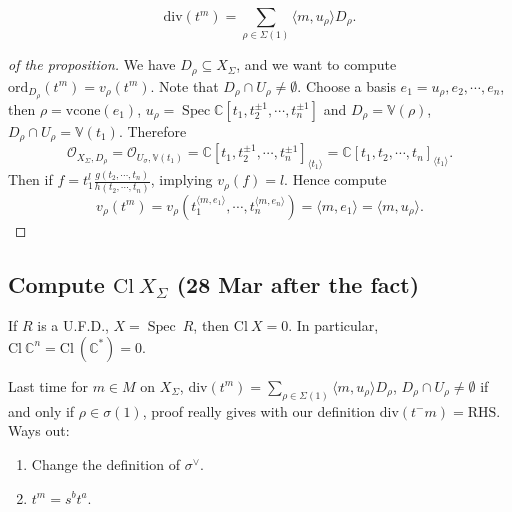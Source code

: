 \documentclass[a4paper,12pt]{amsart}
\newcommand{\CC}{\mathbb{C}}
\DeclareMathOperator{\Spec}{Spec}
\begin{document}
\begin{corollary}
	\begin{displaymath}
	\mathrm{div}(t^m)=\sum_{\rho\in\Sigma(1)}\langle m,u_\rho\rangle D_\rho.
	\end{displaymath}
\end{corollary}

\begin{proof}[of the proposition]
	We have $D_\rho\subseteq X_\Sigma$, and we want to compute $\mathrm{ord}_{D_\rho}(t^m)=v_\rho(t^m)$. Note that $D_\rho\cap U_\rho\neq\emptyset$. Choose a basis $e_1=u_\rho,e_2,\cdots,e_n$, then $\rho=\mathrm{vcone}(e_1)$, $u_\rho=\Spec\CC[t_1,t_2^{\pm1},\cdots,t_n^{\pm1}]$ and $D_\rho=\mathbb{V}(\rho)$, $D_\rho\cap U_\rho=\mathbb{V}(t_1)$. Therefore
	\begin{displaymath}
	\mathscr{O}_{X_\Sigma,D_\rho}=\mathscr{O}_{U_\sigma,\mathbb{V}(t_1)}=\CC[t_1,t_2^{\pm1},\cdots,t_n^{\pm1}]_{\langle t_1\rangle}=\CC[t_1,t_2,\cdots,t_n]_{\langle t_1\rangle}.
	\end{displaymath}
	Then if  $f=t_1^l\frac{g(t_2,\cdots,t_n)}{h(t_2,\cdots,t_n)}$, implying $v_\rho(f)=l$. Hence compute
	\begin{displaymath}
	v_\rho(t^m)=v_\rho(t_1^{\langle m,e_1\rangle},\cdots,t_n^{\langle m,e_n\rangle})=\langle m,e_1\rangle=\langle m,u_\rho\rangle.
	\end{displaymath}
\end{proof}

\subsection{Compute $\mathrm{Cl}~X_\Sigma$ (28 Mar after the fact)}

\begin{Fact}
	If $R$ is a U.F.D., $X=\Spec~R$, then $\mathrm{Cl}~X=0$. In particular, $\mathrm{Cl}~\CC^n=\mathrm{Cl}~(\CC^*)=0$.
\end{Fact}

Last time for $m\in M$ on $X_\Sigma$, $\mathrm{div}(t^m)=\sum_{\rho\in\Sigma(1)}\langle m,u_\rho\rangle D_\rho$, $D_\rho\cap U_\rho\neq\emptyset$ if and only if $\rho\in\sigma(1)$, proof really gives with our definition $\mathrm{div}(t^-m)=\mathrm{RHS}$. Ways out:
\begin{enumerate}
	\item Change the definition of $\sigma^\vee$.
	\item $t^m=s^bt^a$.
	\begin{center}
	\end{center}
\end{enumerate}
\end{document}
